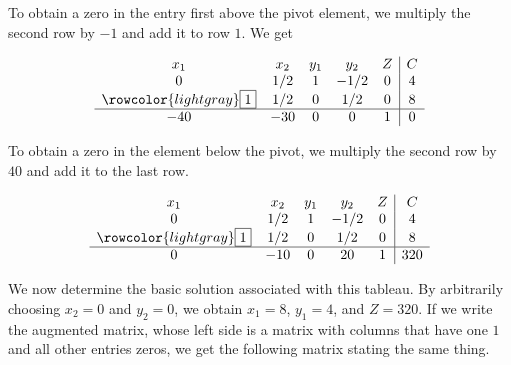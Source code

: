 \begin{solution}
\begin{enumerate}
              To obtain a zero in the entry first above the pivot element, we multiply the second row by \(-1\) and add it to row \(1\). We get

              \[
                  \begin{array}{ccccc|c}
                      x_1                           & x_2 & y_1 & y_2  & Z & C \\
                      0                             & 1/2 & 1   & -1/2 & 0 & 4 \\
                      \rowcolor{lightgray} \fbox{1} & 1/2 & 0   & 1/2  & 0 & 8 \\
                      \hline
                      -40                           & -30 & 0   & 0    & 1 & 0 \\
                  \end{array}
              \]

              To obtain a zero in the element below the pivot, we multiply the second row by \(40\) and add it to the last row.

              \[
                  \begin{array}{ccccc|c}
                      x_1                           & x_2 & y_1 & y_2  & Z & C   \\
                      0                             & 1/2 & 1   & -1/2 & 0 & 4   \\
                      \rowcolor{lightgray} \fbox{1} & 1/2 & 0   & 1/2  & 0 & 8   \\
                      \hline
                      0                             & -10 & 0   & 20   & 1 & 320 \\
                  \end{array}
              \]


              We now determine the basic solution associated with this tableau. By arbitrarily choosing \( x_2 = 0 \) and \( y_2 = 0 \), we obtain \( x_1 = 8 \), \( y_1 = 4 \), and \( Z = 320 \). If we write the augmented matrix, whose left side is a matrix with columns that have one \(1\) and all other entries zeros, we get the following matrix stating the same thing.




\end{enumerate}
\end{solution}
